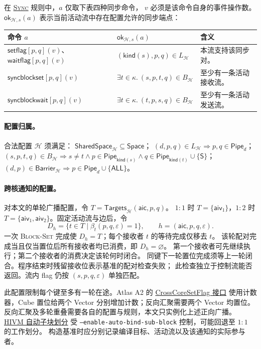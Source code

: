 \documentclass[UTF8,a4paper,11pt,fontset=fandol]{ctexart}
\newcommand{\kw}[1]{\ensuremath{\mathsf{#1}}}
\begin{document}
在 \hyperlink{wf-sync}{\textsc{Sync}} 规则中，$a$ 仅取下表四种同步命令，
$v$ 必须是该命令自身的事件操作数。
$\mathsf{ok}_{\mathcal H,s}(a)$ 表示当前活动流中存在配置允许的同步端点：
\begin{center}\small
\begin{tabularx}{\linewidth}{@{}l l Y@{}}
\toprule
命令 $a$ & $\mathsf{ok}_{\mathcal H,s}(a)$ & 含义 \\
\midrule
$\kw{setflag}[p,q](v)$、$\kw{waitflag}[p,q](v)$
 & $(\mathsf{kind}(s),p,q)\in L_{\mathcal H}$ & 本流支持该同步对。\\
$\kw{syncblockset}[p,q](v)$
 & $\exists t\in\kappa.\ (s,p,t,q)\in B_{\mathcal H}$ & 至少有一条活动接收流。\\
$\kw{syncblockwait}[p,q](v)$
 & $\exists t\in\kappa.\ (t,p,s,q)\in B_{\mathcal H}$ & 至少有一条活动发送流。\\
\bottomrule
\end{tabularx}
\end{center}

\paragraph{配置归属。}
合法配置 $\mathcal H$ 须满足：
$\mathsf{SharedSpace}_{\mathcal H}\subseteq\mathsf{Space}$；
$(d,p,q)\in L_{\mathcal H}\Rightarrow p,q\in\mathsf{Pipe}_d$；
$(s,p,t,q)\in B_{\mathcal H}\Rightarrow s\ne t\land p\in\mathsf{Pipe}_{\mathsf{kind}(s)}\land q\in\mathsf{Pipe}_{\mathsf{kind}(t)}\cup\{\mathsf S\}$；
$(d,p)\in\mathsf{Barrier}_{\mathcal H}\Rightarrow p\in\mathsf{Pipe}_d\cup\{\mathsf{ALL}\}$。

\paragraph{跨核通知的配置。}
对本文的单轮广播配置，令
$T=\mathsf{Targets}_{\mathcal H}(\mathsf{aic},p,q)$。
$1{:}1$ 时 $T=\{\mathsf{aiv}_1\}$，$1{:}2$ 时
$T=\{\mathsf{aiv}_1,\mathsf{aiv}_2\}$。固定活动流与边后，令
\[
 D_h=\{t\in T\mid\beta_t(p,q,\varepsilon)=1\},
 \qquad h=(\mathsf{aic},p,q,\varepsilon).
\]
一次 \textsc{Block-Set} 完成使 $D_h=T$；每个接收者 $t$ 的等待完成仅移去 $t$。
该轮配对完成当且仅当置位后所有接收者均已消费，即 $D_h=\varnothing$。
第一个接收者可先继续执行；第二个接收者的消费决定该轮何时闭合。
同键下一轮置位完成须等上一轮闭合。程序结束时残留接收位表示基准的配对检查失败；
此检查独立于控制流能否返回。流内 flag 仍按 $(s,p,q,\varepsilon)$ 单独匹配。

此配置限制每个键至多有一轮在途。Atlas A2 的
\href{https://www.hiascend.com/doc_center/source/zh/canncommercial/80RC2/apiref/opdevgapi/atlasascendc_api_07_0268.html}{CrossCoreSetFlag 接口}
使用计数器，Cube 置位给两个 Vector 分别增加计数；反向汇聚需要两个 Vector 均置位。
反向汇聚及多轮重叠需要各自的配置与规则，本文只实例化上述正向广播。
\href{https://ascendnpu-ir.gitcode.com/en/developer_guide/features/auto_subtiling.html}{HIVM 自动子块划分}
受 \texttt{--enable-auto-bind-sub-block} 控制，可能回退至 $1{:}1$ 的工作划分。
构造基准时应分别记录编译目标、活动流以及该通知的实际参与者。
\end{document}
